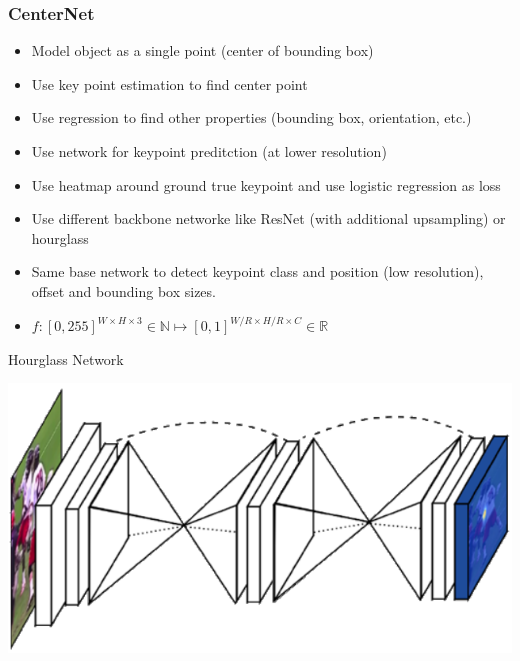 \subsubsection{CenterNet}
\begin{minipage}{0.5\textwidth}
    \begin{itemize}
        \item Model object as a single point (center of bounding box)
        \item Use key point estimation to find center point
        \item Use regression to find other properties (bounding box, orientation, etc.)
        \item Use network for keypoint preditction (at lower resolution)
        \item Use heatmap around ground true keypoint and use logistic regression as loss
        \item Use different backbone networke like ResNet (with additional upsampling) or hourglass
        \item Same base network to detect keypoint class and position (low resolution), offset and bounding box sizes.
        \item $f: [0,255]^{W \times H \times 3} \in \mathbb{N} \mapsto [0,1]^{W/R \times H/R \times C} \in \mathbb{R}$
    \end{itemize}
\end{minipage}
\begin{minipage}{0.5\textwidth}
    \centering
    Hourglass Network

    \includegraphics[width=\textwidth]{sections/FindingMultipleObjects/img/hourglass.png}
\end{minipage}
